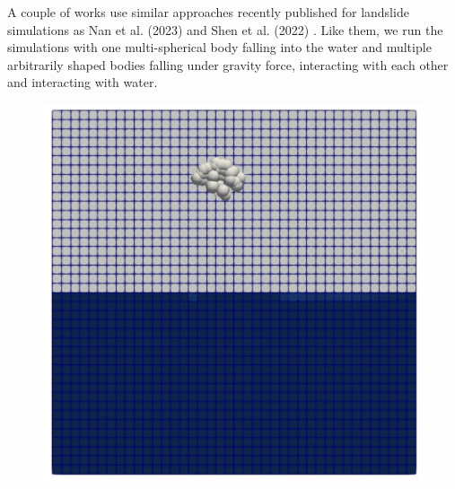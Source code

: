 A couple of works use similar approaches recently published for landslide simulations as Nan et al. (2023) \cite{nan2023high} and Shen et al. (2022) \cite{shen2022resolved}.
Like them, we run the simulations with one multi-spherical body falling into the water and multiple arbitrarily shaped bodies falling under gravity force, interacting with each other and interacting with water.


\begin{figure}[H]
    \centering
    \begin{minipage}{.5\textwidth}
        \centering
        \includegraphics[width=\linewidth]{GWU_Thesis_Sarmakeeva/Images/chap4/clump_1.png}
    \end{minipage}%
    \begin{minipage}{.5\textwidth}
        \centering

\end{minipage}
\end{figure}
